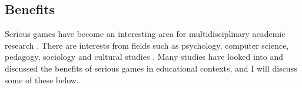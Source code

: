 \documentclass[a4paper,11.5pt]{report}
\numberwithin{figure}{section}
\numberwithin{table}{section}
\numberwithin{equation}{section}
\numberwithin{equation}{section}
\begin{document}







\subsection{Benefits}

Serious games have become an interesting area for multidisciplinary academic research \citep{Breuer2010}. There are interests from fields such as psychology, computer science, pedagogy, sociology and cultural studies \citep{Breuer2010}. Many studies have looked into and discussed the benefits of serious games in educational contexts, and I will discuss some of these below.
\end{document}
